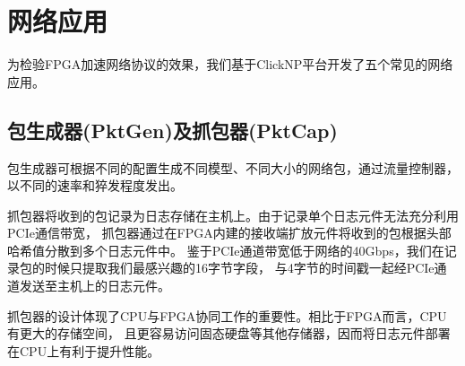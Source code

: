 \chapter{网络应用}
为检验FPGA加速网络协议的效果，我们基于ClickNP平台开发了五个常见的网络应用。

\section{包生成器(PktGen)及抓包器(PktCap)}
包生成器可根据不同的配置生成不同模型、不同大小的网络包，通过流量控制器，以不同的速率和猝发程度发出。

抓包器将收到的包记录为日志存储在主机上。由于记录单个日志元件无法充分利用PCIe通信带宽，
抓包器通过在FPGA内建的接收端扩放元件将收到的包根据头部哈希值分散到多个日志元件中。
鉴于PCIe通道带宽低于网络的40Gbps，我们在记录包的时候只提取我们最感兴趣的16字节字段，
与4字节的时间戳一起经PCIe通道发送至主机上的日志元件。

抓包器的设计体现了CPU与FPGA协同工作的重要性。相比于FPGA而言，CPU有更大的存储空间，
且更容易访问固态硬盘等其他存储器，因而将日志元件部署在CPU上有利于提升性能。


